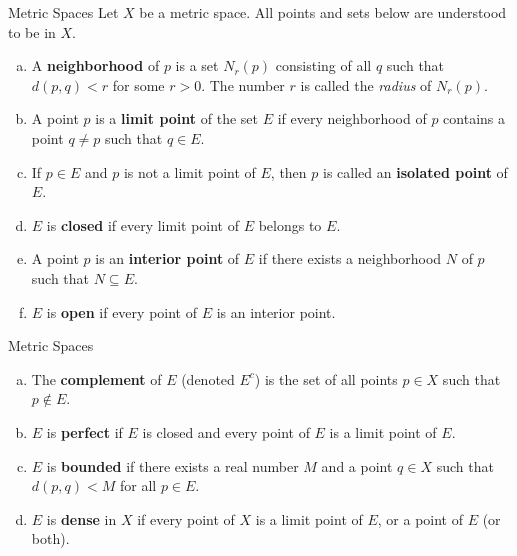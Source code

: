 \documentclass{beamer}
\begin{document}
\begin{frame}{Metric Spaces}
 Let $X$ be a metric space. All points and sets below are understood to be in $X$.


\begin{enumerate}[(a)]
    \item A \textbf{neighborhood} of $p$ is a set $N_r(p)$ consisting of all $q$ such that 
    $d(p,q) < r$ for some $r > 0$. The number $r$ is called the \emph{radius} of $N_r(p)$.

    \item A point $p$ is a \textbf{limit point} of the set $E$ if every neighborhood of $p$
    contains a point $q \neq p$ such that $q \in E$.

    \item If $p \in E$ and $p$ is not a limit point of $E$, then $p$ is called an \textbf{isolated point} of $E$.

    \item $E$ is \textbf{closed} if every limit point of $E$ belongs to $E$.

    \item A point $p$ is an \textbf{interior point} of $E$ if there exists a neighborhood $N$ of $p$
    such that $N \subseteq E$.

    \item $E$ is \textbf{open} if every point of $E$ is an interior point.
\end{enumerate}
\end{frame}
\begin{frame}{Metric Spaces}
\begin{enumerate}[(a)]
    \item The \textbf{complement} of $E$ (denoted $E^c$) is the set of all points $p \in X$
    such that $p \notin E$.

    \item $E$ is \textbf{perfect} if $E$ is closed and every point of $E$ is a limit point of $E$.

    \item $E$ is \textbf{bounded} if there exists a real number $M$ and a point $q \in X$
    such that $d(p,q) < M$ for all $p \in E$.

    \item $E$ is \textbf{dense} in $X$ if every point of $X$ is a limit point of $E$, 
    or a point of $E$ (or both).
\end{enumerate}





\end{frame}
\end{document}
